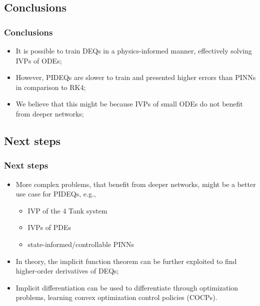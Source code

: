 \documentclass[t]{beamer}
\begin{document}
\subsection{Conclusions}

\begin{frame}
    \frametitle{Conclusions}
    \begin{itemize}[label={\textbullet}]
        \item<1-> It is possible to train DEQs in a physics-informed manner, effectively solving IVPs of ODEs;
	\item<2-> However, PIDEQs are slower to train and presented higher errors than PINNs in comparison to RK4;
	\item<3-> We believe that this might be because IVPs of small ODEs do not benefit from deeper networks;
    \end{itemize}
\end{frame}

\subsection{Next steps}

\begin{frame}
    \frametitle{Next steps}
    \begin{itemize}[label={\textbullet}]
	\item<1-> More complex problems, that benefit from deeper networks, might be a better use case for PIDEQs, e.g., 
	    \begin{itemize}[label={\textbullet}]
	        \item IVP of the 4 Tank system \cite{johansson_quadruple-tank_2000-1}
		\item IVPs of PDEs \cite{Raissi2019}
		\item state-informed/controllable PINNs \cite{Antonelo2021,Arnold2021}
	    \end{itemize}
	\item<2-> In theory, the implicit function theorem can be further exploited to find higher-order derivatives of DEQs;
	\item<3-> Implicit differentiation can be used to differentiate through optimization problems, learning convex optimization control policies (COCPs).
    \end{itemize}
\end{frame}
\end{document}
